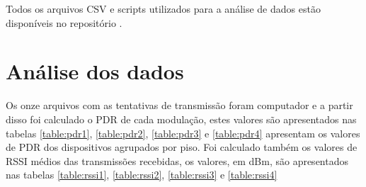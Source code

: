 Todos os arquivos CSV e scripts utilizados para a análise de dados estão disponíveis no repositório \cite{wisun-traces}.

\section{Análise dos dados}


Os onze arquivos com as tentativas de transmissão foram computador e a partir disso foi calculado o PDR de cada modulação, estes valores são apresentados nas tabelas \ref{table:pdr1}, \ref{table:pdr2}, \ref{table:pdr3} e \ref{table:pdr4} apresentam os valores de PDR dos dispositivos agrupados por piso. Foi calculado também os valores de RSSI médios das transmissões recebidas, os valores, em dBm, são apresentados nas tabelas \ref{table:rssi1}, \ref{table:rssi2}, \ref{table:rssi3} e \ref{table:rssi4}

